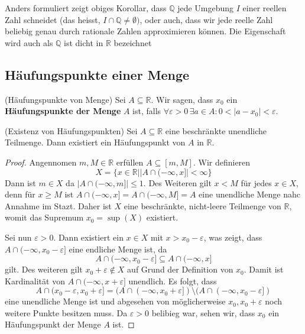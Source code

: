 \documentclass[../Analysis1_script.tex]{subfiles}
\begin{document}
Anders formuliert zeigt obiges Korollar, dass $\mathbb {Q}$ jede Umgebung $I$ einer reellen Zahl schneidet (das heisst, $I \cap \mathbb {Q} \neq \emptyset)$, oder auch, dass wir jede reelle Zahl beliebig genau durch rationale Zahlen approximieren können. Die Eigenschaft wird auch als $\mathbb {Q}$ ist dicht in $\mathbb {R}$ bezeichnet

\subsection{Häufungspunkte einer Menge}

\begin{definition}{(Häufungspunkte von Menge)}
	Sei $A \subseteq \mathbb{R}$. Wir sagen, dass $x_0$ ein \textbf{Häufungspunkte der Menge} $A$ ist, falls $\forall \varepsilon > 0 \, \exists a \in A: 0 < |a - x_0| < \varepsilon$. 
\end{definition}

\begin{proposition}{(Existenz von Häufungspunkten)}
	Sei $A\subseteq \mathbb {R}$ eine beschränkte unendliche Teilmenge. Dann existiert ein Häufungspunkt von $A$ in $\mathbb {R}$. 
\end{proposition}

\def\svgwidth{\columnwidth}


\begin{proof}
	Angennomen $m, M \in \mathbb{R}$ erfüllen $A \subseteq [m, M]$. Wir definieren
	\[X = \{ x \in \mathbb{R} \big| |A \cap (-\infty, x]| < \infty\}\]
	Dann ist $m \in X$ da $|A \cap (-\infty, m]| \leq 1$. Des Weiteren gilt $x < M$ für jedes $x \in X$, denn für $x \geq M$ ist $A \cap (-\infty, x] = A \cap (-\infty, M] = A$ eine unendliche Menge nahc Annahme im Stazt. Daher ist $X$ eine beschränkte, nicht-leere Teilmenge von $\mathbb{R}$, womit das Supremum $x_0 = \sup(X)$ existiert.
	
	Sei nun $\varepsilon > 0$. Dann existiert ein $x \in X$ mit $x > x_0 - \varepsilon$, was zeigt, dass $A \cap (-\infty, x_0 - \varepsilon]$ eine endliche Menge ist, da
	\[A \cap (-\infty, x_0 - \varepsilon] \subseteq A \cap (-\infty, x]\]
	gilt. Des weiteren gilt $x_0 + \varepsilon \notin X$ auf Grund der Definition von $x_0$. Damit ist Kardinalität von $A \cap (-\infty, x + \varepsilon]$ unendlich. Es folgt, dass 
	\[A \cap (x_0 - \varepsilon, x_0 + \varepsilon] = (A \cap (-\infty, x_0 + \varepsilon]) \setminus (A \cap (-\infty, x_0 - \varepsilon])\]
	eine unendliche Menge ist und abgesehen von möglicherweise $x_0, x_0 + \varepsilon$ noch weitere Punkte besitzen muss. Da $\varepsilon > 0$ belibieg war, sehen wir, dass $x_0$ ein Häufungspunkt der Menge $A$ ist.
\end{proof}
\end{document}
